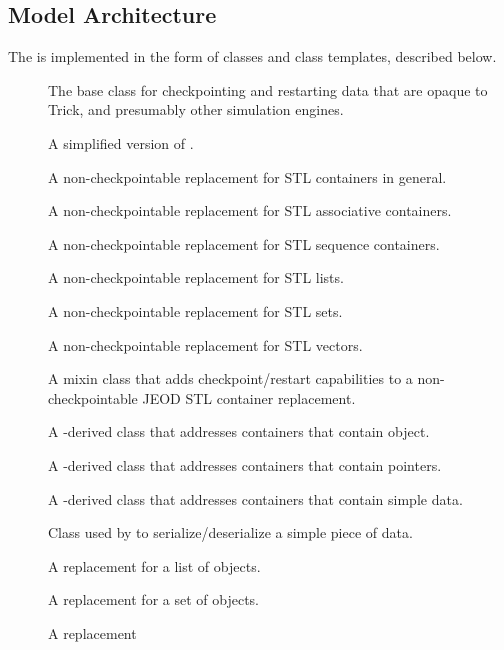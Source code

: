 \subsection{Model Architecture}
The \ModelDesc is implemented in the form of \Cplusplus classes and class
templates, described below.
\begin{description}
\item[\bf{}] The base class for checkpointing and
  restarting data that are opaque to Trick,
  and presumably other simulation engines.
\item[\bf{}] A simplified version of
.
\item[\bf{}] A non-checkpointable replacement
  for STL containers in general.
\item[\bf{}] A non-checkpointable replacement
  for STL associative containers.
\item[\bf{}] A non-checkpointable replacement
  for STL sequence containers.
\item[\bf{}] A non-checkpointable replacement for STL lists.
\item[\bf{}] A non-checkpointable replacement for STL sets.
\item[\bf{}] A non-checkpointable replacement for STL vectors.
\item[\bf{}] A mixin class that adds checkpoint/restart
  capabilities to a non-checkpointable JEOD STL container replacement.
\item[\bf{}] A -derived class
  that addresses containers that contain object.
\item[\bf{}] A -derived class
  that addresses containers that contain pointers.
\item[\bf{}] A -derived class
  that addresses containers that contain simple data.
\item[\bf{}] Class used by
   to serialize/deserialize a simple piece of data.
\item[\bf{}] A  replacement
  for a list of objects.
\item[\bf{}] A  replacement
  for a set of objects.
\item[\bf{}] A  replacement

\end{description}
